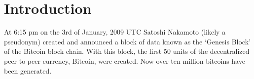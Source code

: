 \section{Introduction}
%
%



% 
% 
% 
% 

At 6:15 pm on the 3rd of January, 2009 UTC Satoshi Nakamoto (likely a pseudonym) created and announced a block of data known as the `Genesis Block' of the Bitcoin block chain\cite{satoshi}. With this block, the first 50 units of the decentralized peer to peer currency, Bitcoin, were created.  Now over ten million bitcoins have been generated.

